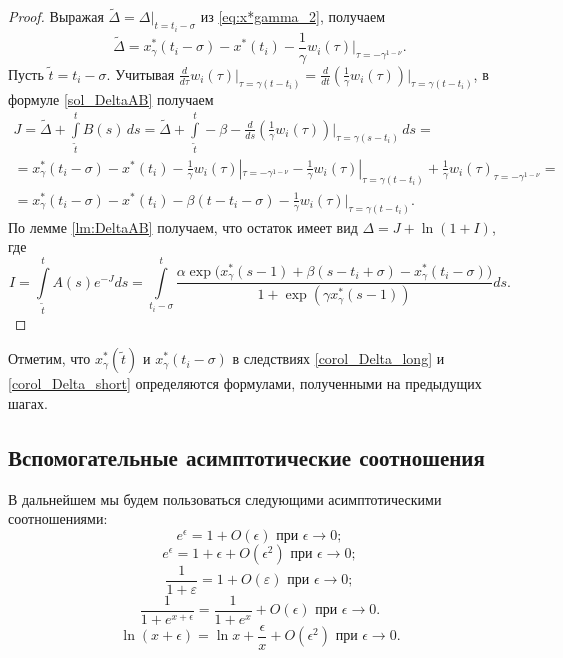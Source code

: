 %
\begin{proof}
	Выражая $\tilde{\Delta} = \Delta|_{t = t_i - \sigma}$ из \eqref{eq:x*gamma_2}, получаем
\[
	\tilde{\Delta} = x^*_{\gamma}(t_i - \sigma) - x^*(t_i) - \frac{1}{\gamma} w_i(\tau)|_{\tau = -\gamma^{1-\nu}}.
\]
Пусть $\tilde{t} = t_i - \sigma$. Учитывая $\frac{d}{d\tau} w_i(\tau)|_{\tau = \gamma(t - t_i)} = \frac{d}{dt} \left(\frac{1}{\gamma}w_i(\tau)\right)\big|_{\tau = \gamma(t - t_i)}$, в формуле \eqref{sol_DeltaAB} получаем
\begin{multline*}
	J = \tilde{\Delta} + \int\limits_{\tilde{t}}^{t} B(s)\,ds = \tilde{\Delta} + \int\limits_{\tilde{t}}^{t} -\beta - \frac{d}{ds} \left(\frac{1}{\gamma}w_i(\tau)\right)\big|_{\tau = \gamma(s - t_i)} \,ds =\\= x^*_{\gamma}(t_i - \sigma) - x^*(t_i) - \frac{1}{\gamma} w_i(\tau)|_{\tau = -\gamma^{1-\nu}} - \frac{1}{\gamma}w_i(\tau)|_{\tau = \gamma(t - t_i)} + \frac{1}{\gamma}w_i(\tau)_{\tau = -\gamma^{1 - \nu}} = \\
	= x^*_{\gamma}(t_i - \sigma) - x^*(t_i) - \beta(t - t_i - \sigma) - \frac{1}{\gamma} w_i(\tau)|_{\tau = \gamma(t - t_i)}.
\end{multline*}
%
По лемме \ref{lm:DeltaAB} получаем, что остаток имеет вид $\Delta = J + \ln(1 + I)$, где 
\[
I = \int\limits_{\tilde{t}}^{t}A(s) e^{-J} ds = \int\limits_{t_i-\sigma}^{t}\frac{\alpha\exp\big(x_{\gamma}^*(s-1)+\beta(s-t_i+\sigma)-x_{\gamma}^*(t_i-\sigma)\big)}{1+\exp(\gamma x_{\gamma}^*(s-1))}ds.
\]
\end{proof}
%
Отметим, что $x_{\gamma}^*(\tilde{t})$ и $x_{\gamma}^*(t_i-\sigma)$ в следствиях \ref{corol_Delta_long} и \ref{corol_Delta_short} определяются формулами, полученными на предыдущих шагах.

\subsection{Вспомогательные асимптотические соотношения}

В дальнейшем мы будем пользоваться следующими асимптотическими соотношениями:
\begin{equation}
\label{eq:exp_const}
	e^{\epsilon} = 1 + O(\epsilon) \text{ при } \epsilon \to 0;
\end{equation}
\begin{equation}
\label{eq:exp_linear}
	e^{\epsilon} = 1 + \epsilon + O(\epsilon^2) \text{ при } \epsilon \to 0;
\end{equation}
\begin{equation}
\label{eq:asymp_frac}
	\frac{1}{1 + \varepsilon} = 1 + O(\varepsilon) \text{ при } \epsilon \to 0;
\end{equation}
\begin{equation}
\label{eq:exp_frac}
	\dfrac{1}{1 + e^{x + \epsilon}} = \frac{1}{1 + e^x} + O(\epsilon) \text{ при } \epsilon \to 0.
\end{equation}
\begin{equation}
\label{eq:ln_frac}
\ln(x + \epsilon) = \ln x + \frac{\epsilon}{x} + O(\epsilon^2) \text{ при } \epsilon \to 0.
\end{equation}

